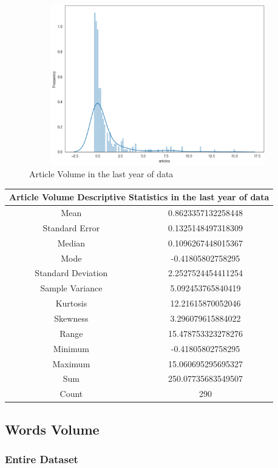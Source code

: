\begin{figure}[h!]
\centering
\includegraphics[width=15cm,height=7cm,keepaspectratio]{resultsEvaluation/articleDesc1.png}
\caption{Article Volume in the last year of data}
\label{fig:appendix_articleDesc1}
\end{figure}
\begin{center}
\begin{tabular}{ c c }
\hline
\multicolumn{2}{|c|}{Article Volume Descriptive Statistics in the last year of data} \\
\hline
Mean & 0.8623357132258448 \\
Standard Error & 0.1325148497318309 \\
Median & 0.1096267448015367 \\
Mode & -0.41805802758295 \\
Standard Deviation & 2.2527524454411254 \\
Sample Variance & 5.092453765840419 \\
Kurtosis & 12.21615870052046 \\
Skewness & 3.296079615884022 \\
Range & 15.478753323278276 \\
Minimum & -0.41805802758295 \\
Maximum & 15.060695295695327 \\
Sum & 250.07735683549507 \\
Count & 290
\end{tabular}
\end{center}

\subsection{Words Volume}

\subsubsection{Entire Dataset}

